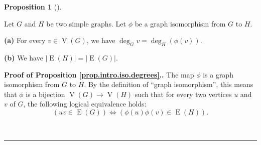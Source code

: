 \documentclass[numbers=enddot,12pt,final,onecolumn,notitlepage]{scrartcl}%
\theoremstyle{definition}
\newtheorem{prop}[theo]{Proposition}
\newenvironment{proposition}[1][]
{\begin{prop}[#1]\begin{leftbar}}
{\end{leftbar}\end{prop}}
\newenvironment{proof}[1][Proof]{\noindent\textbf{#1.} }{\ \rule{0.5em}{0.5em}}
\newcommand{\abs}[1]{\left| #1 \right|}
\newcommand{\tup}[1]{\left( #1 \right)}
\newcommand{\verts}[1]{\operatorname{V}\left( #1 \right)}
\newcommand{\edges}[1]{\operatorname{E}\left( #1 \right)}
\begin{document}
\begin{proposition} \label{prop.intro.iso.degrees}
Let $G$ and $H$ be two simple graphs. Let $\phi$ be a graph
isomorphism from $G$ to $H$.

\textbf{(a)} For every $v \in \verts{G}$, we have
$\deg_G v = \deg_H \tup{\phi\tup{v}}$.

\textbf{(b)} We have
$\abs{\edges{H}} = \abs{\edges{G}}$.
\end{proposition}

\begin{proof}[Proof of Proposition \ref{prop.intro.iso.degrees}.]
The map $\phi$ is a graph isomorphism from $G$ to $H$. By the
definition of ``graph isomorphism'', this means that $\phi$ is a
bijection $\verts{G} \to \verts{H}$ such that for every two
vertices $u$ and $v$ of $G$, the following logical equivalence holds:
\begin{equation}
\left( uv \in \edges{G} \right)
\Longleftrightarrow
\left( \phi\tup{u}\phi\tup{v} \in \edges{H} \right) .
\label{pf.prop.intro.iso.degrees.1}
\end{equation}


\end{proof}
\end{document}
